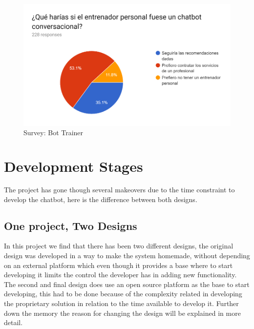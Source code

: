 \begin{center}
	\begin{figure}[h!]
		\centering
		\includegraphics[scale=1]{./images/4-bot-trainer}
		\caption{Survey: Bot Trainer}
		\label{4_bot_trainer}
	\end{figure}
\end{center}



\section{Development Stages}\label{sec:chap1_dev-stag}
The project has gone though several makeovers due to the time constraint to develop the chatbot, here is the difference between both designs. 

\subsection{One project, Two Designs}\label{sec:chap4_design}

In this project we find that there has been two different designs, the original design was developed in a way to make the system homemade, without depending on an external platform which even though it provides a base where to start developing it limits the control the developer has in adding new functionality.\\

The second and final design does use an open source platform as the base to start developing, this had to be done because of the complexity related in developing the proprietary solution in relation to the time available to develop it. Further down the memory the reason for changing the design will be explained in more detail.

